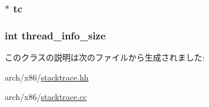 \label{classX86ISA_1_1ProcessInfo_a6bca839d8255baba5c53a5eace70d72e}
\hypertarget{classX86ISA_1_1ProcessInfo_a4455a4759e69e5ebe68ae7298cbcc37d}{
\subsubsection[{tc}]{$\ast$ {\bf tc}}}
\label{classX86ISA_1_1ProcessInfo_a4455a4759e69e5ebe68ae7298cbcc37d}
\hypertarget{classX86ISA_1_1ProcessInfo_aa02520c2e86b94388e0d4f4a7b0873b3}{
\subsubsection[{thread\_\-info\_\-size}]{\setlength{\rightskip}{0pt plus 5cm}int {\bf thread\_\-info\_\-size}}}
\label{classX86ISA_1_1ProcessInfo_aa02520c2e86b94388e0d4f4a7b0873b3}


このクラスの説明は次のファイルから生成されました:\begin{DoxyCompactItemize}
\item 
arch/x86/\hyperlink{x86_2stacktrace_8hh}{stacktrace.hh}\item 
arch/x86/\hyperlink{x86_2stacktrace_8cc}{stacktrace.cc}\end{DoxyCompactItemize}
